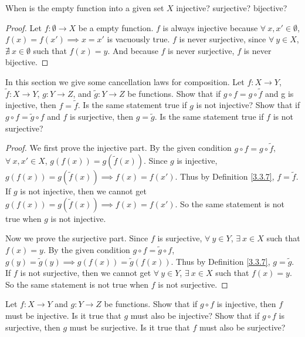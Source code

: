 \begin{exercise}\label{ex 3.3.3}
When is the empty function into a given set \(X\) injective?
surjective?
bijective?
\end{exercise}

\begin{proof}
Let \(f : \emptyset \to X\) be a empty function.
\(f\) is always injective because \(\forall\ x, x' \in \emptyset\), \(f(x) = f(x') \implies x = x'\) is vacuously true.
\(f\) is never surjective, since \(\forall\ y \in X\), \(\nexists\ x \in \emptyset\) such that \(f(x) = y\).
And because \(f\) is never surjective, \(f\) is never bijective.
\end{proof}

\begin{exercise}\label{ex 3.3.4}
In this section we give some cancellation laws for composition.
Let \(f : X \to Y\), \(\tilde{f} : X \to Y\), \(g : Y \to Z\), and \(\tilde{g} : Y \to Z\) be functions.
Show that if \(g \circ f = g \circ \tilde{f}\) and g is injective, then \(f = \tilde{f}\).
Is the same statement true if \(g\) is not injective?
Show that if \(g \circ f = \tilde{g} \circ f\) and \(f\) is surjective, then \(g = \tilde{g}\).
Is the same statement true if \(f\) is not surjective?
\end{exercise}

\begin{proof}
We first prove the injective part.
By the given condition \(g \circ f = g \circ \tilde{f}\), \(\forall\ x, x' \in X\), \(g(f(x)) = g(\tilde{f}(x))\).
Since \(g\) is injective, \(g(f(x)) = g(\tilde{f}(x)) \implies f(x) = f(x')\).
Thus by Definition \ref{3.3.7}, \(f = \tilde{f}\).
If \(g\) is not injective, then we cannot get \(g(f(x)) = g(\tilde{f}(x)) \implies f(x) = f(x')\).
So the same statement is not true when \(g\) is not injective.

Now we prove the surjective part.
Since \(f\) is surjective, \(\forall\ y \in Y\), \(\exists\ x \in X\) such that \(f(x) = y\).
By the given condition \(g \circ f = \tilde{g} \circ f\), \(g(y) = \tilde{g}(y) \implies g(f(x)) = \tilde{g}(f(x))\).
Thus by Definition \ref{3.3.7}, \(g = \tilde{g}\).
If \(f\) is not surjective, then we cannot get \(\forall\ y \in Y\), \(\exists\ x \in X\) such that \(f(x) = y\).
So the same statement is not true when \(f\) is not surjective.
\end{proof}

\begin{exercise}\label{ex 3.3.5}
Let \(f : X \to Y\) and \(g : Y \to Z\) be functions.
Show that if \(g \circ f\) is injective, then \(f\) must be injective.
Is it true that \(g\) must also be injective?
Show that if \(g \circ f\) is surjective, then \(g\) must be surjective.
Is it true that \(f\) must also be surjective?
\end{exercise}

